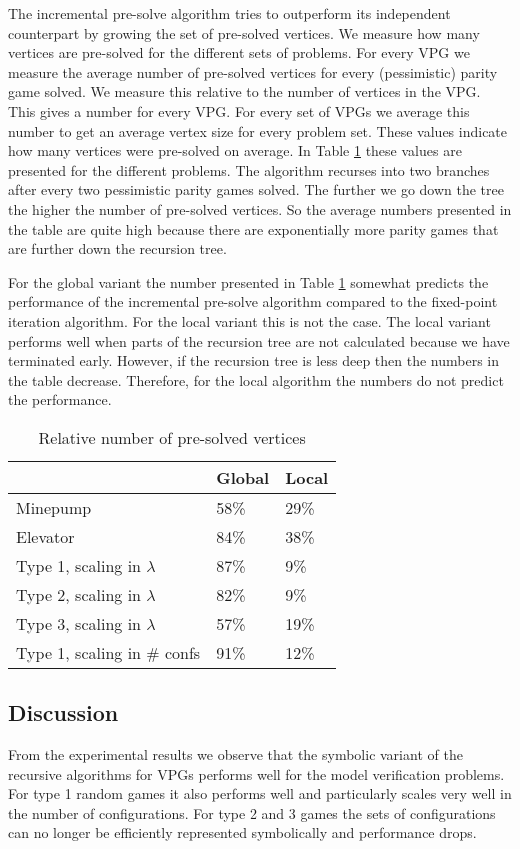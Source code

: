 The incremental pre-solve algorithm tries to outperform its independent counterpart by growing the set of pre-solved vertices. We measure how many vertices are pre-solved for the different sets of problems. For every VPG we measure the average number of pre-solved vertices for every (pessimistic) parity game solved. We measure this relative to the number of vertices in the VPG. This gives a number for every VPG. For every set of VPGs we average this number to get an average vertex size for every problem set. These values indicate how many vertices were pre-solved on average. In Table \ref{tab_mean_presolved} these values are presented for the different problems. The algorithm recurses into two branches after every two pessimistic parity games solved. The further we go down the tree the higher the number of pre-solved vertices. So the average numbers presented in the table are quite high because there are exponentially more parity games that are further down the recursion tree.

For the global variant the number presented in Table \ref{tab_mean_presolved} somewhat predicts the performance of the incremental pre-solve algorithm compared to the fixed-point iteration algorithm. For the local variant this is not the case. The local variant performs well when parts of the recursion tree are not calculated because we have terminated early. However, if the recursion tree is less deep then the numbers in the table decrease. Therefore, for the local algorithm the numbers do not predict the performance.

\begin{table}[h]
	\centering
	\begin{tabular}{|l|l|l|}
		\hline
		& Global & Local \\ \hline
		Minepump& 58\%& 29\%\\ \hline
		Elevator& 84\% & 38\%\\ \hline
		Type 1, scaling in $\lambda$& 87\%& 9\%\\ \hline
		Type 2, scaling in $\lambda$& 82\%& 9\%\\ \hline
		Type 3, scaling in $\lambda$& 57\%& 19\%\\ \hline
		Type 1, scaling in \# confs& 91\%& 12\%\\ \hline
	\end{tabular}
	\caption{Relative number of pre-solved vertices}
	\label{tab_mean_presolved}
\end{table}

\subsection{Discussion}
From the experimental results we observe that the symbolic variant of the recursive algorithms for VPGs performs well for the model verification problems. For type 1 random games it also performs well and particularly scales very well in the number of configurations. For type 2 and 3 games the sets of configurations can no longer be efficiently represented symbolically and performance drops.


